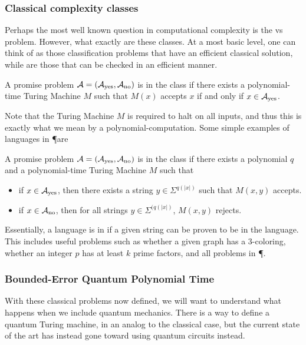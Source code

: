 \documentclass[../thesis-main/thesis-main]{subfiles}
\begin{document}
\subsubsection{Classical complexity classes}

  Perhaps the most well known question in computational complexity is the \PP vs \NP problem.  However, what exactly are these classes.  At a most basic level, one can think of \PP as those classification problems that have an efficient classical solution, while \NP are those that can be checked in an efficient manner.  


\begin{definition}[\PP]
  A promise problem $\mathcal{A}= (\mathcal{A}_{\text{yes}},\mathcal{A}_{\text{no}})$ is in the class \PP if there exists a polynomial-time Turing Machine $M$ such that $M(x)$ accepts $x$ if and only if $x\in \mathcal{A}_{\text{yes}}$.
\end{definition}

Note that the Turing Machine $M$ is required to halt on all inputs, and thus this is exactly what we mean by a polynomial-computation.  Some simple examples of languages in \P are 


\begin{definition}[\NP]
  A promise problem $\mathcal{A}=(\mathcal{A}_{\text{yes}},\mathcal{A}_{\text{no}})$ is in the class \NP if there exists a polynomial $q$ and a polynomial-time Turing Machine $M$ such that
  \begin{itemize}
    \item if $x\in \mathcal{A}_{\text{yes}}$, then there exists a string $y\in \Sigma^{q(|x|)}$ such that $M(x,y)$ accepts.
    \item if $x\in \mathcal{A}_{\text{no}}$, then for all strings $y\in \Sigma^{(q(|x|)}$, $M(x,y)$ rejects.
  \end{itemize}
\end{definition}
Essentially, a language is in \NP if a given string can be proven to be in the language.  This includes useful problems such as whether a given graph has a 3-coloring, whether an integer $p$ has at least $k$ prime factors, and all problems in \P.


\subsubsection{Bounded-Error Quantum Polynomial Time}

With these classical problems now defined, we will want to understand what happens when we include quantum mechanics.  There is a way to define a quantum Turing machine, in an analog to the classical case, but the current state of the art has instead gone toward using quantum circuits instead.  
\end{document}

